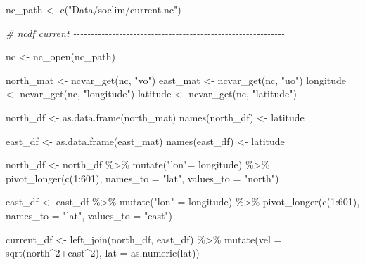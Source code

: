 \documentclass[
]{article}
\newenvironment{Shaded}{\begin{snugshade}}{\end{snugshade}}
\newcommand{\AttributeTok}[1]{\textcolor[rgb]{0.77,0.63,0.00}{#1}}
\newcommand{\CommentTok}[1]{\textcolor[rgb]{0.56,0.35,0.01}{\textit{#1}}}
\newcommand{\DecValTok}[1]{\textcolor[rgb]{0.00,0.00,0.81}{#1}}
\newcommand{\FunctionTok}[1]{\textcolor[rgb]{0.00,0.00,0.00}{#1}}
\newcommand{\NormalTok}[1]{#1}
\newcommand{\OtherTok}[1]{\textcolor[rgb]{0.56,0.35,0.01}{#1}}
\newcommand{\SpecialCharTok}[1]{\textcolor[rgb]{0.00,0.00,0.00}{#1}}
\newcommand{\StringTok}[1]{\textcolor[rgb]{0.31,0.60,0.02}{#1}}
\begin{document}
\begin{Shaded}
\begin{Highlighting}[]
\NormalTok{nc\_path }\OtherTok{\textless{}{-}} \FunctionTok{c}\NormalTok{(}\StringTok{"Data/soclim/current.nc"}\NormalTok{)}

\CommentTok{\# ncdf current {-}{-}{-}{-}{-}{-}{-}{-}{-}{-}{-}{-}{-}{-}{-}{-}{-}{-}{-}{-}{-}{-}{-}{-}{-}{-}{-}{-}{-}{-}{-}{-}{-}{-}{-}{-}{-}{-}{-}{-}{-}{-}{-}{-}{-}{-}{-}{-}{-}{-}{-}{-}{-}{-}{-}{-}{-}{-}{-}{-}}


\NormalTok{nc }\OtherTok{\textless{}{-}} \FunctionTok{nc\_open}\NormalTok{(nc\_path)}

\NormalTok{north\_mat }\OtherTok{\textless{}{-}} \FunctionTok{ncvar\_get}\NormalTok{(nc, }\StringTok{"vo"}\NormalTok{)}
\NormalTok{east\_mat }\OtherTok{\textless{}{-}} \FunctionTok{ncvar\_get}\NormalTok{(nc, }\StringTok{"uo"}\NormalTok{)}
\NormalTok{longitude }\OtherTok{\textless{}{-}} \FunctionTok{ncvar\_get}\NormalTok{(nc, }\StringTok{"longitude"}\NormalTok{)}
\NormalTok{latitude }\OtherTok{\textless{}{-}} \FunctionTok{ncvar\_get}\NormalTok{(nc, }\StringTok{"latitude"}\NormalTok{)}

\NormalTok{north\_df }\OtherTok{\textless{}{-}} \FunctionTok{as.data.frame}\NormalTok{(north\_mat)}
\FunctionTok{names}\NormalTok{(north\_df) }\OtherTok{\textless{}{-}}\NormalTok{ latitude}

\NormalTok{east\_df }\OtherTok{\textless{}{-}} \FunctionTok{as.data.frame}\NormalTok{(east\_mat)}
\FunctionTok{names}\NormalTok{(east\_df) }\OtherTok{\textless{}{-}}\NormalTok{ latitude}

\NormalTok{north\_df }\OtherTok{\textless{}{-}}\NormalTok{ north\_df }\SpecialCharTok{\%\textgreater{}\%} \FunctionTok{mutate}\NormalTok{(}\StringTok{"lon"}\OtherTok{=}\NormalTok{  longitude) }\SpecialCharTok{\%\textgreater{}\%} 
  \FunctionTok{pivot\_longer}\NormalTok{(}\FunctionTok{c}\NormalTok{(}\DecValTok{1}\SpecialCharTok{:}\DecValTok{601}\NormalTok{), }\AttributeTok{names\_to =} \StringTok{"lat"}\NormalTok{, }\AttributeTok{values\_to =} \StringTok{"north"}\NormalTok{)}

\NormalTok{east\_df }\OtherTok{\textless{}{-}}\NormalTok{ east\_df }\SpecialCharTok{\%\textgreater{}\%} \FunctionTok{mutate}\NormalTok{(}\StringTok{"lon"} \OtherTok{=}\NormalTok{ longitude) }\SpecialCharTok{\%\textgreater{}\%} 
  \FunctionTok{pivot\_longer}\NormalTok{(}\FunctionTok{c}\NormalTok{(}\DecValTok{1}\SpecialCharTok{:}\DecValTok{601}\NormalTok{), }\AttributeTok{names\_to =} \StringTok{"lat"}\NormalTok{, }\AttributeTok{values\_to =} \StringTok{"east"}\NormalTok{)}

\NormalTok{current\_df }\OtherTok{\textless{}{-}} \FunctionTok{left\_join}\NormalTok{(north\_df, east\_df) }\SpecialCharTok{\%\textgreater{}\%}
  \FunctionTok{mutate}\NormalTok{(}\AttributeTok{vel =} \FunctionTok{sqrt}\NormalTok{(north}\SpecialCharTok{\^{}}\DecValTok{2}\SpecialCharTok{+}\NormalTok{east}\SpecialCharTok{\^{}}\DecValTok{2}\NormalTok{),}
         \AttributeTok{lat =} \FunctionTok{as.numeric}\NormalTok{(lat))}
\end{Highlighting}
\end{Shaded}
\end{document}
